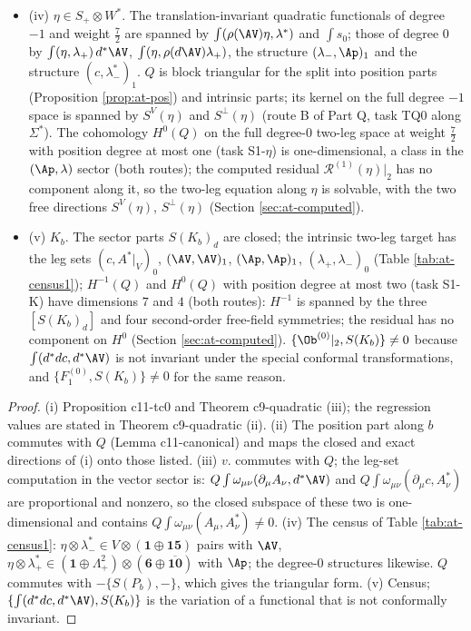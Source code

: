 \begin{proposition}
\begin{itemize}
\item (iv) $\eta\in S_+\otimes W^*$. The translation-invariant quadratic functionals of degree $-1$ and weight $\tfrac72$ are spanned by $\int(\rho(\AV)\eta,\lambda^*)$ and $\int s_0$; those of degree $0$ by $\int(\eta,\lambda_+)\,d^*\AV$, $\int(\eta,\rho(d\AV)\lambda_+)$, the structure $(\lambda_-,\Ap)_1$ and the structure $(c,\lambda^*_-)_1$. $Q$ is block triangular for the split into position parts (Proposition \ref{prop:at-pos}) and intrinsic parts; its kernel on the full degree $-1$ space is spanned by $S^V(\eta)$ and $S^\perp(\eta)$ (route B of Part Q, task TQ0 along $\Sigma^*$). The cohomology $H^0(Q)$ on the full degree-$0$ two-leg space at weight $\tfrac72$ with position degree at most one (task S1-$\eta$) is one-dimensional, a class in the $(\Ap,\lambda)$ sector (both routes); the computed residual $\mathcal R^{(1)}(\eta)|_2$ has no component along it, so the two-leg equation along $\eta$ is solvable, with the two free directions $S^V(\eta)$, $S^\perp(\eta)$ (Section \ref{sec:at-computed}).
\item (v) $K_b$. The sector parts $S(K_b)_d$ are closed; the intrinsic two-leg target has the leg sets $(c,A^*|_V)_0$, $(\AV,\AV)_1$, $(\Ap,\Ap)_1$, $(\lambda_+,\lambda_-)_0$ (Table \ref{tab:at-census1}); $H^{-1}(Q)$ and $H^0(Q)$ with position degree at most two (task S1-K) have dimensions $7$ and $4$ (both routes): $H^{-1}$ is spanned by the three $[S(K_b)_d]$ and four second-order free-field symmetries; the residual has no component on $H^0$ (Section \ref{sec:at-computed}). $\{\Ob^{(0)}|_2,S(K_b)\}\neq0$ because $\int(d^*dc,d^*\AV)$ is not invariant under the special conformal transformations, and $\{F_1^{(0)},S(K_b)\}\neq0$ for the same reason.
\end{itemize}
\end{proposition}

\begin{proof}
(i) Proposition c11-tc0 and Theorem c9-quadratic (iii); the regression values are stated in Theorem c9-quadratic (ii). (ii) The position part along $b$ commutes with $Q$ (Lemma c11-canonical) and maps the closed and exact directions of (i) onto those listed. (iii) $v.$ commutes with $Q$; the leg-set computation in the vector sector is: $Q\int\omega_{\mu\nu}(\partial_\mu A_\nu,d^*\AV)$ and $Q\int\omega_{\mu\nu}(\partial_\mu c,A^*_\nu)$ are proportional and nonzero, so the closed subspace of these two is one-dimensional and contains $Q\int\omega_{\mu\nu}(A_\mu,A^*_\nu)\ne0$. (iv) The census of Table \ref{tab:at-census1}: $\eta\otimes\lambda^*_-\in V\otimes(\mathbf1\oplus\mathbf{15})$ pairs with $\AV$, $\eta\otimes\lambda^*_+\in(\mathbf1\oplus\Lambda^2_+)\otimes(\mathbf6\oplus\overline{\mathbf{10}})$ with $\Ap$; the degree-$0$ structures likewise. $Q$ commutes with $-\{S(P_b),-\}$, which gives the triangular form. (v) Census; $\{\int(d^*dc,d^*\AV),S(K_b)\}$ is the variation of a functional that is not conformally invariant.
\end{proof}

